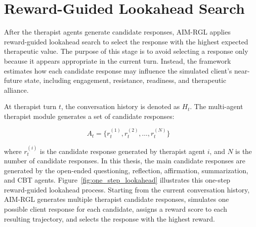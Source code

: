 \section{Reward-Guided Lookahead Search}

After the therapist agents generate candidate responses, AIM-RGL applies reward-guided lookahead search to select the response with the highest expected therapeutic value. The purpose of this stage is to avoid selecting a response only because it appears appropriate in the current turn. Instead, the framework estimates how each candidate response may influence the simulated client’s near-future state, including engagement, resistance, readiness, and therapeutic alliance.

At therapist turn \(t\), the conversation history is denoted as \(H_t\). The multi-agent therapist module generates a set of candidate responses:

\[
A_t = \{r_t^{(1)}, r_t^{(2)}, \ldots, r_t^{(N)}\}
\]

where \(r_t^{(i)}\) is the candidate response generated by therapist agent \(i\), and \(N\) is the number of candidate responses. In this thesis, the main candidate responses are generated by the open-ended questioning, reflection, affirmation, summarization, and CBT agents. Figure~\ref{fig:one_step_lookahead} illustrates this one-step reward-guided lookahead process. Starting from the current conversation history, AIM-RGL generates multiple therapist candidate responses, simulates one possible client response for each candidate, assigns a reward score to each resulting trajectory, and selects the response with the highest reward.

